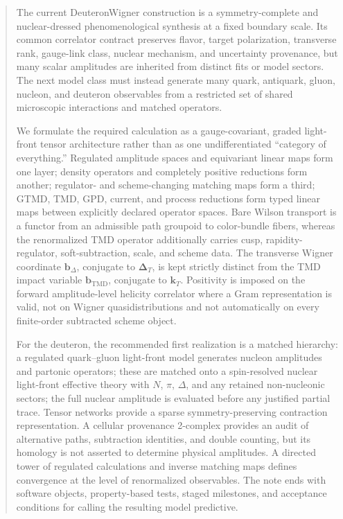 \documentclass[11pt]{article}
\newcommand{\kT}{\bm{k}_{T}}
\newcommand{\DT}{\bm{\Delta}_{T}}
\newcommand{\bD}{\bm{b}_{\Delta}}
\newcommand{\bM}{\bm{b}_{\mathrm{TMD}}}
\begin{document}
\begin{abstract}
The current DeuteronWigner construction is a symmetry-complete and
nuclear-dressed phenomenological synthesis at a fixed boundary scale.  Its
common correlator contract preserves flavor, target polarization, transverse
rank, gauge-link class, nuclear mechanism, and uncertainty provenance, but
many scalar amplitudes are inherited from distinct fits or model sectors.
The next model class must instead generate many quark, antiquark, gluon,
nucleon, and deuteron observables from a restricted set of shared microscopic
interactions and matched operators.

We formulate the required calculation as a gauge-covariant, graded
light-front tensor architecture rather than as one undifferentiated
``category of everything.''  Regulated amplitude spaces and equivariant
linear maps form one layer; density operators and completely positive
reductions form another; regulator- and scheme-changing matching maps form a
third; GTMD, TMD, GPD, current, and process reductions form typed linear maps
between explicitly declared operator spaces.  Bare Wilson transport is a
functor from an admissible path groupoid to color-bundle fibers, whereas the
renormalized TMD operator additionally carries cusp, rapidity-regulator,
soft-subtraction, scale, and scheme data.  The transverse Wigner coordinate
\(\bD\), conjugate to \(\DT\), is kept strictly distinct from the TMD
impact variable \(\bM\), conjugate to \(\kT\).  Positivity is imposed on the
forward amplitude-level helicity correlator where a Gram representation is
valid, not on Wigner quasidistributions and not automatically on every
finite-order subtracted scheme object.

For the deuteron, the recommended first realization is a matched hierarchy:
a regulated quark--gluon light-front model generates nucleon amplitudes and
partonic operators; these are matched onto a spin-resolved nuclear
light-front effective theory with \(N\), \(\pi\), \(\Delta\), and any
retained non-nucleonic sectors; the full nuclear amplitude is evaluated
before any justified partial trace.  Tensor networks provide a sparse
symmetry-preserving contraction representation.  A cellular provenance
2-complex provides an audit of alternative paths, subtraction identities,
and double counting, but its homology is not asserted to determine physical
amplitudes.  A directed tower of regulated calculations and inverse matching
maps defines convergence at the level of renormalized observables.  The note
ends with software objects, property-based tests, staged milestones, and
acceptance conditions for calling the resulting model predictive.
\end{abstract}
\end{document}
